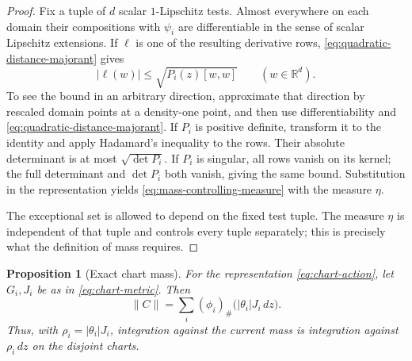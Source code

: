 \documentclass[11pt]{article}
\numberwithin{equation}{section}
\newtheorem{proposition}[theorem]{Proposition}
\theoremstyle{definition}
\theoremstyle{remark}
\newcommand{\R}{\mathbb R}
\newcommand{\dd}{\,d}
\begin{document}
\begin{proof}
Fix a tuple of \(d\) scalar \(1\)-Lipschitz tests. Almost everywhere on
each domain their compositions with \(\psi_i\) are differentiable in
the sense of scalar Lipschitz extensions. If \(\ell\) is one of the
resulting derivative rows, \eqref{eq:quadratic-distance-majorant} gives
\[
 |\ell(w)|\le\sqrt{P_i(z)[w,w]}\qquad(w\in\R^d).
\]
To see the bound in an arbitrary direction, approximate that direction
by rescaled domain points at a density-one point, and then use
differentiability and \eqref{eq:quadratic-distance-majorant}.
If \(P_i\) is positive definite, transform it to the identity and apply
Hadamard's inequality to the rows. Their absolute determinant is at most
\(\sqrt{\det P_i}\). If \(P_i\) is singular, all rows vanish on its
kernel; the full determinant and \(\det P_i\) both vanish, giving the
same bound. Substitution in the representation yields
\eqref{eq:mass-controlling-measure} with the measure \(\eta\).

The exceptional set is allowed to depend on the fixed test tuple. The
measure \(\eta\) is independent of that tuple and controls every tuple
separately; this is precisely what the definition of mass requires.
\end{proof}

\begin{proposition}[Exact chart mass]
\label{prop:chart-mass}
For the representation \eqref{eq:chart-action}, let \(G_i,J_i\) be as
in \eqref{eq:chart-metric}. Then
\begin{equation}
\label{eq:chart-mass}
 \|C\|=\sum_i(\phi_i)_\#\bigl(|\theta_i|J_i\dd z\bigr).
\end{equation}
Thus, with \(\rho_i=|\theta_i|J_i\), integration against the current
mass is integration against \(\rho_i\dd z\) on the disjoint charts.
\end{proposition}
\end{document}
